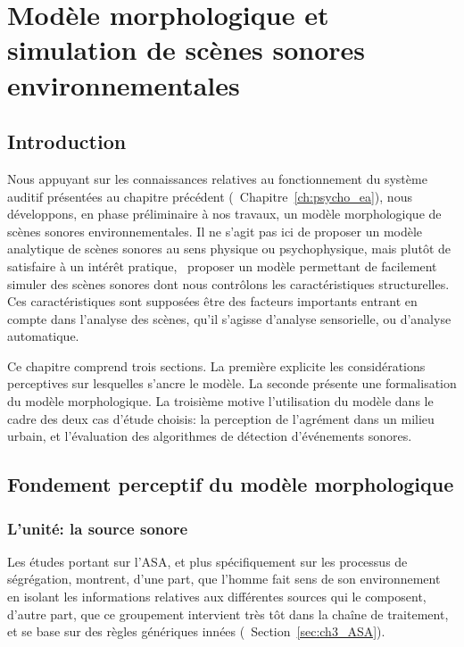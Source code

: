 \chapter[Modèle et simulation]{Modèle morphologique et simulation de scènes sonores environnementales}\label{ch:psycho_model} 

\section{Introduction}

Nous appuyant sur les connaissances relatives au fonctionnement du système auditif présentées au chapitre précédent (\cf~Chapitre~\ref{ch:psycho_ea}), nous développons, en phase préliminaire à nos travaux, un modèle morphologique de scènes sonores environnementales. Il ne s'agit pas ici de proposer un modèle analytique de scènes sonores au sens physique ou psychophysique, mais plutôt de satisfaire à un intérêt pratique, \ie~proposer un modèle permettant de facilement simuler des scènes sonores dont nous contrôlons les caractéristiques structurelles. Ces caractéristiques sont supposées être des facteurs importants entrant en compte dans l'analyse des scènes, qu'il s'agisse d'analyse sensorielle, ou d'analyse automatique.


Ce chapitre comprend trois sections. La première explicite les considérations perceptives sur lesquelles s'ancre le modèle. La seconde présente une formalisation du modèle morphologique. La troisième motive l'utilisation du modèle dans le cadre des deux cas d'étude choisis: la perception de l'agrément dans un milieu urbain, et l'évaluation des algorithmes de détection d'événements sonores.

\section{Fondement perceptif du modèle morphologique}
\label{sec:ch4_model}

\subsection{L'unité: la source sonore}

Les études portant sur l'ASA, et plus spécifiquement sur les processus de ségrégation, montrent, d'une part, que l'homme fait sens de son environnement en isolant les informations relatives aux différentes sources qui le composent, d'autre part, que ce groupement intervient très tôt dans la chaîne de traitement, et se base sur des règles génériques innées (\cf~Section~\ref{sec:ch3_ASA}).

